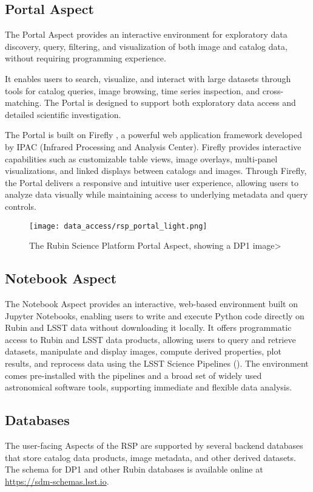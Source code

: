 \subsection{Portal Aspect
\label{ssec:rsp_portal}}
The Portal Aspect provides an interactive environment for exploratory data discovery, query, filtering, and visualization of both image and catalog data,  without requiring programming experience.

It enables users to search, visualize, and interact with large datasets through tools for catalog queries, image browsing, time series inspection, and cross-matching.
The Portal is designed to support both exploratory data access and detailed scientific investigation.

The Portal is built on \gls{Firefly} \citep{2019ASPC..521...32W}, a powerful web application framework developed by IPAC (Infrared Processing and Analysis Center).
\gls{Firefly} provides interactive capabilities such as customizable table views, image overlays, multi-panel visualizations, and linked displays between catalogs and images.
Through \gls{Firefly}, the Portal delivers a responsive and intuitive user experience, allowing users to analyze data visually while maintaining access to underlying metadata and query controls.
\begin{figure}[htb]
\centering
\texttt{[image: data\_access/rsp\_portal\_light.png]}
\caption{The Rubin \gls{Science Platform} Portal Aspect, showing a DP1 image> }
\label{fig:rsp_portal}
\end{figure}

\subsection{Notebook Aspect
\label{subsec:notebook}}
The Notebook Aspect provides an interactive, web-based environment built on Jupyter Notebooks, enabling users to write and execute Python code directly on Rubin and \gls{LSST} data without downloading it locally.
It offers programmatic access to Rubin and LSST data products, allowing users to query and retrieve datasets, manipulate and display images, compute derived properties, plot results, and reprocess data using the \gls{LSST Science Pipelines} ().
The environment comes pre-installed with the pipelines and a broad set of widely used astronomical \gls{software} tools, supporting immediate and flexible data analysis.

\subsection{Databases
\label{ssec:databases}}
The user-facing Aspects of the \gls{RSP} are supported by several backend databases that store catalog data products, image metadata, and other derived datasets.
The \gls{schema} for DP1 and other Rubin databases is available online at \url{https://sdm-schemas.lsst.io}.

